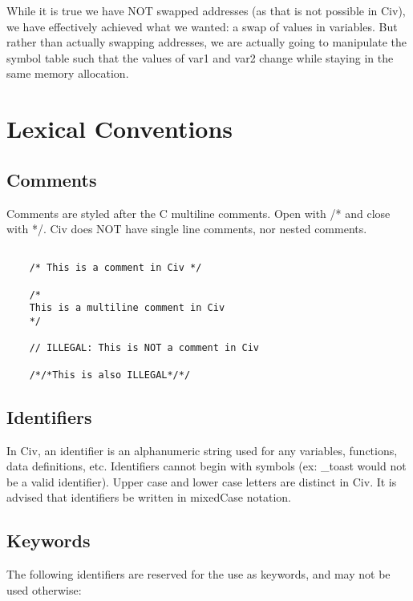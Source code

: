 \documentclass[a4paper]{article}
\begin{document}
While it is true we have NOT swapped addresses (as that is not possible in Civ), we have effectively achieved what we wanted: a swap of values in variables. But rather than actually swapping addresses, we are actually going to manipulate the symbol table such that the values of var1 and var2 change while staying in the same memory allocation.

\section{Lexical Conventions}

\subsection{Comments}

Comments are styled after the C multiline comments. Open with /* and close with */. Civ does NOT have single line comments, nor nested comments.

{\selectfont
\begin{lstlisting}
   
	/* This is a comment in Civ */
  
	/*
	This is a multiline comment in Civ
	*/
    
	// ILLEGAL: This is NOT a comment in Civ
   
	/*/*This is also ILLEGAL*/*/
\end{lstlisting}
}

\subsection{Identifiers}

In Civ, an identifier is an alphanumeric string used for any variables, functions, data definitions, etc. Identifiers cannot begin with symbols (ex: \_toast would not be a valid identifier). Upper case and lower case letters are distinct in Civ. It is advised that identifiers be written in mixedCase notation.

\subsection{Keywords}

The following identifiers are reserved for the use as keywords, and may not be used otherwise:
\end{document}
